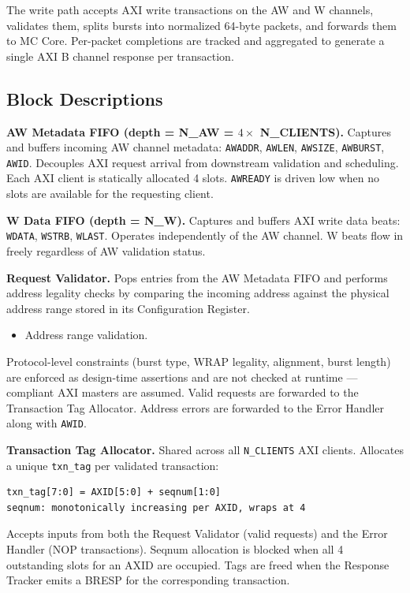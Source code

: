 The write path accepts AXI write transactions on the AW and W channels, validates them, splits bursts into normalized 64-byte packets, and forwards them to MC Core. Per-packet completions are tracked and aggregated to generate a single AXI B channel response per transaction.

\subsection{Block Descriptions}

\textbf{AW Metadata FIFO (depth = N\_AW = $4 \times$ N\_CLIENTS).}
Captures and buffers incoming AW channel metadata: \texttt{AWADDR}, \texttt{AWLEN}, \texttt{AWSIZE}, \texttt{AWBURST}, \texttt{AWID}. Decouples AXI request arrival from downstream validation and scheduling. Each AXI client is statically allocated 4 slots. \texttt{AWREADY} is driven low when no slots are available for the requesting client.

\textbf{W Data FIFO (depth = N\_W).}
Captures and buffers AXI write data beats: \texttt{WDATA}, \texttt{WSTRB}, \texttt{WLAST}. Operates independently of the AW channel. W beats flow in freely regardless of AW validation status.

\textbf{Request Validator.}
Pops entries from the AW Metadata FIFO and performs address legality checks by comparing the incoming address against the physical address range stored in its Configuration Register.
\begin{itemize}[noitemsep]
    \item Address range validation.
\end{itemize}
Protocol-level constraints (burst type, WRAP legality, alignment, burst length) are enforced as design-time assertions and are not checked at runtime — compliant AXI masters are assumed. Valid requests are forwarded to the Transaction Tag Allocator. Address errors are forwarded to the Error Handler along with \texttt{AWID}.

\textbf{Transaction Tag Allocator.}
Shared across all \texttt{N\_CLIENTS} AXI clients. Allocates a unique \texttt{txn\_tag} per validated transaction:
\begin{lstlisting}
txn_tag[7:0] = AXID[5:0] + seqnum[1:0]
seqnum: monotonically increasing per AXID, wraps at 4
\end{lstlisting}
Accepts inputs from both the Request Validator (valid requests) and the Error Handler (NOP transactions). Seqnum allocation is blocked when all 4 outstanding slots for an AXID are occupied. Tags are freed when the Response Tracker emits a BRESP for the corresponding transaction.

